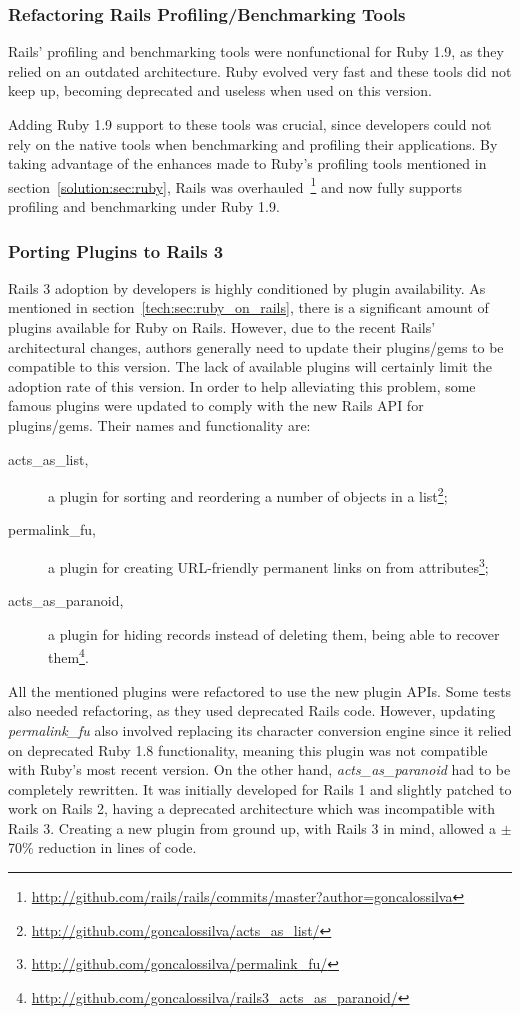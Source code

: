 \subsubsection{Refactoring Rails Profiling/Benchmarking Tools}
Rails' profiling and benchmarking tools were nonfunctional for Ruby 1.9, as they relied on an outdated architecture. Ruby evolved very fast and these tools did not keep up, becoming deprecated and useless when used on this version.

Adding Ruby 1.9  support to these tools was crucial, since developers could not rely on the native tools when benchmarking and profiling their applications. By taking advantage of the enhances made to Ruby's profiling tools mentioned in section~\ref{solution:sec:ruby}, Rails was overhauled~\footnote{\url{http://github.com/rails/rails/commits/master?author=goncalossilva}} and now fully supports profiling and benchmarking under Ruby 1.9.

\subsubsection{Porting Plugins to Rails 3}
Rails 3 adoption by developers is highly conditioned by plugin availability. As mentioned in section~\ref{tech:sec:ruby_on_rails}, there is a significant amount of plugins available for Ruby on Rails. However, due to the recent Rails' architectural changes, authors generally need to update their plugins/gems to be compatible to this version. The lack of available plugins will certainly limit the adoption rate of this version. In order to help alleviating this problem, some famous plugins were updated to comply with the new Rails API for plugins/gems. Their names and functionality are:
\begin{description}
  \item[acts\_as\_list,] a plugin for sorting and reordering a number of objects in a list\footnote{\url{http://github.com/goncalossilva/acts_as_list/}};
  \item[permalink\_fu,] a plugin for creating URL-friendly permanent links on from attributes\footnote{\url{http://github.com/goncalossilva/permalink_fu/}};
  \item[acts\_as\_paranoid,] a plugin for hiding records instead of deleting them, being able to recover them\footnote{\url{http://github.com/goncalossilva/rails3_acts_as_paranoid/}}.
\end{description}
All the mentioned plugins were refactored to use the new plugin APIs. Some tests also needed refactoring, as they used deprecated Rails code. However, updating \textit{permalink\_fu} also involved replacing its character conversion engine since it relied on deprecated Ruby 1.8 functionality, meaning this plugin was not compatible with Ruby's most recent version. On the other hand, \textit{acts\_as\_paranoid} had to be completely rewritten. It was initially developed for Rails 1 and slightly patched to work on Rails 2, having a deprecated architecture which was incompatible with Rails 3. Creating a new plugin from ground up, with Rails 3 in mind, allowed a $\pm$70\% reduction in lines of code.

